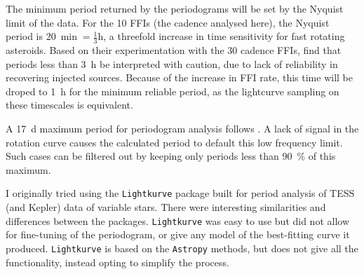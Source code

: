 \documentclass{UCreport}
\begin{document}
The minimum period returned by the periodograms will be set by the Nyquist limit of the data.
For the \qty{10}{\min} FFIs (the cadence analysed here), the Nyquist period is $\qty{20}{\min}=\frac13\unit{\hour}$, a threefold increase in time sensitivity for fast rotating asteroids.
Based on their experimentation with the \qty{30}{\min} cadence FFIs, \citet{McNeill2023} find that periods less than \qty{3}{\hour} be interpreted with caution, due to lack of reliability in recovering injected sources.
Because of the increase in FFI rate, this time will be droped to \qty{1}{\hour} for the minimum reliable period, as the lightcurve sampling on these timescales is equivalent.

A \qty{17}{\day} maximum period for  periodogram analysis follows \citeauthor{McNeill2023}.
A lack of signal in the rotation curve causes the calculated period to default this low frequency limit.
Such cases can be filtered out by keeping only periods less than \qty{90}{\percent} of this maximum.

I originally tried using the \texttt{Lightkurve} \citep{Lightkurve2018} package built for period analysis of TESS (and Kepler) data of variable stars.
There were interesting similarities and differences between the packages.
\texttt{Lightkurve} was easy to use but did not allow for fine-tuning of the periodogram, or give any model of the best-fitting curve it produced.
\texttt{Lightkurve} is based on the \texttt{Astropy} methods, but does not give all the functionality, instead opting to simplify the process.
\end{document}
